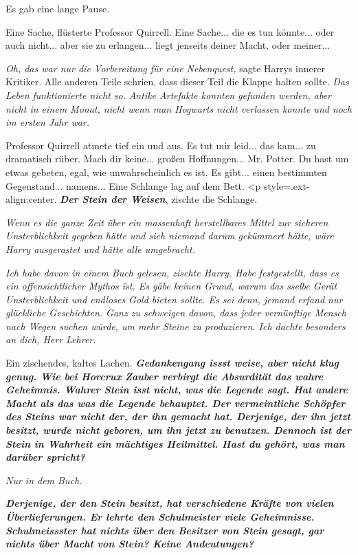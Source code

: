 Es gab eine lange Pause.

\glqq{}Eine Sache\grqq{}, flüsterte Professor Quirrell. \glqq{}Eine Sache... die
es tun könnte... oder auch nicht... aber sie zu erlangen... liegt jenseits
deiner Macht, oder meiner...\grqq{}

\emph{Oh, das war nur die Vorbereitung für eine Nebenquest,} sagte Harrys
innerer Kritiker. Alle anderen Teile schrien, dass dieser Teil die Klappe halten
sollte. \emph{Das Leben funktionierte nicht so.} \emph{Antike Artefakte konnten
gefunden werden, aber nicht in einem Monat, nicht wenn man Hogwarts nicht
verlassen konnte und noch im ersten Jahr war.}

Professor Quirrell atmete tief ein und aus. \glqq{}Es tut mir leid... das kam...
zu dramatisch rüber. Mach dir keine... großen Hoffnungen... Mr. Potter. Du hast
um etwas gebeten, egal, wie unwahrscheinlich es ist. Es gibt... einen bestimmten
Gegenstand... namens...\grqq{} Eine Schlange lag auf dem Bett. <p
style=\grqq{}.ext-align:center\grqq{}. \glqq{}\textbf{\emph{Der Stein der
Weisen}}\grqq{}, zischte die Schlange.

\emph{Wenn es die ganze Zeit über ein massenhaft herstellbares Mittel zur
sicheren Unsterblichkeit gegeben hätte und sich niemand darum gekümmert hätte,
wäre Harry ausgerastet und hätte alle umgebracht.}

\glqq{}\emph{Ich habe davon in einem Buch gelesen\grqq{}, zischte Harry. \glqq{}
Habe festgestellt, dass es ein offensichtlicher Mythos ist. Es gäbe keinen
Grund, warum das sselbe Gerät Unsterblichkeit und endloses Gold bieten sollte.
Es sei denn, jemand erfand nur glückliche Geschichten. Ganz zu schweigen davon,
dass jeder vernünftige Mensch nach Wegen suchen würde, um mehr Steine zu
produzieren. Ich dachte besonders an dich, Herr Lehrer.}\grqq{}

Ein zischendes, kaltes Lachen. \glqq{}\textbf{\emph{Gedankengang issst weise,
aber nicht klug genug. Wie bei Horcrux Zauber verbirgt die Absurdität das wahre
Geheimnis. Wahrer Stein isst nicht, was die Legende sagt. Hat andere Macht als
das was die Legende behauptet. Der vermeintliche Schöpfer des Steins war nicht
der, der ihn gemacht hat. Derjenige, der ihn jetzt besitzt, wurde nicht geboren,
um ihn jetzt zu benutzen. Dennoch ist der Stein in Wahrheit ein mächtiges
Heilmittel. Hast du gehört, was man darüber spricht?}}\grqq{}

\glqq{}\emph{Nur in dem Buch.}\grqq{}

\glqq{}\textbf{\emph{Derjenige, der den Stein besitzt, hat verschiedene Kräfte
von vielen Überlieferungen. Er lehrte den Schulmeister viele Geheimnisse.
Schulmeissster hat nichts über den Besitzer von Stein gesagt, gar nichts über
Macht von Stein? Keine Andeutungen?}}\grqq{}

